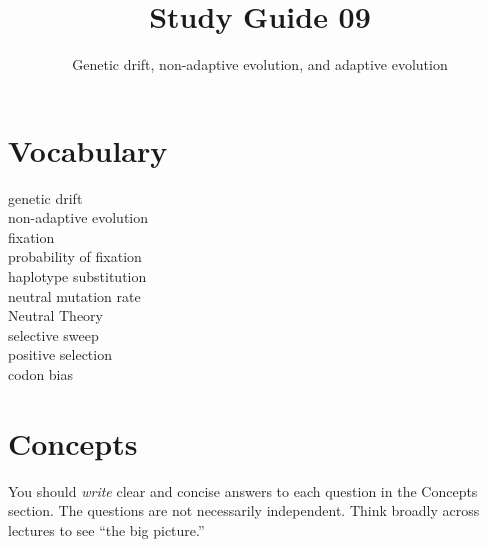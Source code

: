 \documentclass[letterpaper]{tufte-handout}
\title{Study Guide 09\hfill}
\author{Genetic drift, non-adaptive evolution, and adaptive evolution}
\date{} %
\begin{document}
\maketitle	%

\section{Vocabulary}

\begin{multicols}{2}
genetic drift \\
non-adaptive evolution \\
fixation \\
probability of fixation \\
haplotype substitution \\
neutral mutation rate \\
Neutral Theory \\
selective sweep \\
positive selection \\
codon bias
\end{multicols}


\section{Concepts}

You should \emph{write} clear and concise answers to each question in the Concepts section.  The questions are not necessarily independent.  Think broadly across lectures to see ``the big picture.'' 
\end{document}
